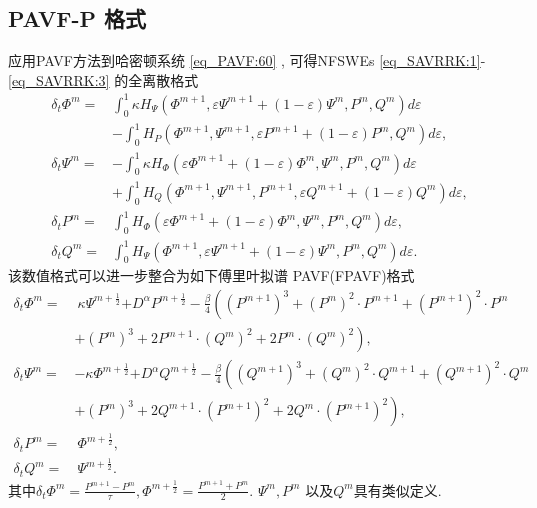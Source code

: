 \subsection{PAVF-P 格式}
应用PAVF方法到哈密顿系统 \eqref{eq_PAVF:60} , 可得NFSWEs \eqref{eq_SAVRRK:1}-\eqref{eq_SAVRRK:3} 的全离散格式
\begin{align}
\delta_{t} \varPhi^{m}=&\int_{0}^{1}\kappa H_{\Psi}\left(\varPhi^{m+1} , \varepsilon \Psi^{m+1}+(1-\varepsilon) \Psi^{m} , P^{m} , Q^{m}\right)d \varepsilon\nonumber\\
&-\int_{0}^{1}H_{P}\left(\varPhi^{m+1} , \Psi^{m+1} , \varepsilon P^{m+1}+(1-\varepsilon) P^{m} , Q^{m}\right)d \varepsilon , \label{eq_PAVF:70}\\
\delta_{t} \Psi^{m}=&-\int_{0}^{1}\kappa H_{\varPhi}\left(\varepsilon \varPhi^{m+1}+(1-\varepsilon) \varPhi^{m} , \Psi^{m} , P^{m} , Q^{m}\right)d \varepsilon\nonumber\\
&+\int_{0}^{1}H_{Q}\left(\varPhi^{m+1} , \Psi^{m+1} , P^{m+1} , \varepsilon Q^{m+1}+(1-\varepsilon) Q^{m}\right)d\varepsilon , \label{eq_PAVF:71}\\
\delta_{t} P^{m}=&\int_{0}^{1}H_{\varPhi}\left(\varepsilon \varPhi^{m+1}+(1-\varepsilon) \varPhi^{m} , \Psi^{m} , P^{m} , Q^{m}\right) d \varepsilon , \label{eq_PAVF:72}\\
\delta_{t} Q^{m}=&\int_{0}^{1}H_{\Psi}\left(\varPhi^{m+1} , \varepsilon \Psi^{m+1}+(1-\varepsilon) \Psi^{m} , P^{m} , Q^{m}\right) d \varepsilon . \label{eq_PAVF:73}
\end{align}
该数值格式可以进一步整合为如下傅里叶拟谱 PAVF(FPAVF)格式
\begin{align}
\delta_{t} \varPhi^{m}=&~\kappa \Psi^{m+\frac{1}{2}}{+D^{\alpha} P^{m+\frac{1}{2}}}-\frac{\beta}{4}\left( (P^{m+1})^3+ (P^{m})^{2}\cdot P^{m+1}+(P^{m+1})^{2}\cdot P^{m}\right . \nonumber\\
	&+\left . (P^{m})^{3}+2 P^{m+1}\cdot (Q^{m})^{2}+2 P^{m}\cdot (Q^{m})^{2}\right) , \label{eq_PAVF:74}\\
\delta_{t} \Psi^{m}=&-\kappa \varPhi^{m+\frac{1}{2}}{+D^{\alpha} Q^{m+\frac{1}{2}}}-\frac{\beta}{4}\left( (Q^{m+1})^3+ (Q^{m})^{2}\cdot Q^{m+1}+(Q^{m+1})^{2}\cdot Q^{m}\right . \nonumber\\
	&+\left . (P^{m})^{3}+2 Q^{m+1}\cdot (P^{m+1})^{2}+2 Q^{m}\cdot (P^{m+1})^{2}\right) , \label{eq_PAVF:75}\\
\delta_{t} P^{m}=&~\varPhi^{m+\frac{1}{2}} , \label{eq_PAVF:76}\\
\delta_{t} Q^{m}=&~\Psi^{m+\frac{1}{2}} . \label{eq_PAVF:77}
\end{align}
其中$\delta_{t} \varPhi^{m} = \frac{P^{m+1}-P^{m}}{\tau}, \varPhi^{m+\frac{1}{2}} = \frac{P^{m+1}+P^{m}}{2}$. $\Psi^{m}, P^{m}$ 以及$Q^{m}$具有类似定义.

